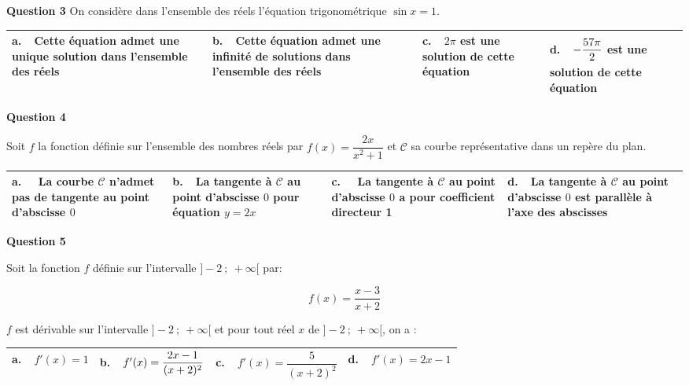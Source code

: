 \medskip

\textbf{Question 3} On considère dans l'ensemble des réels l'équation trigonométrique $\sin x = 1$.

\begin{center}
\begin{tabularx}{\linewidth}{|*{4}{X|}}\hline
\textbf{a.~~}Cette équation admet une unique solution dans l'ensemble des réels&\textbf{b.~~}Cette équation admet une infinité de solutions dans l'ensemble des réels&\textbf{c.~~}$2\pi$ est une solution de cette équation&\textbf{d.~~}$- \dfrac{57\pi\rule{0pt}{11pt}}{2\rule[-3pt]{0pt}{0pt}}$ est une solution de cette équation\\ \hline
\end{tabularx}
\end{center}

\medskip

\textbf{Question 4}

Soit $f$ la fonction définie sur l'ensemble des nombres réels par $f(x) = \dfrac{2x}{x^2 + 1}$
et $\mathcal{C}$ sa courbe représentative dans un repère du plan.

\begin{center}
\begin{tabularx}{\linewidth}{|*{4}{X|}}\hline
\textbf{a.~~} La courbe $\mathcal{C}$ n'admet pas de tangente au point d'abscisse $0$&\textbf{b.~~}La tangente à $\mathcal{C}$ au point d'abscisse $0$ pour équation $y = 2x$&\textbf{c.~~} La tangente à $\mathcal{C}$ au point d'abscisse $0$ a pour coefficient directeur 1&\textbf{d.~~}La tangente à $\mathcal{C}$ au point d'abscisse $0$ est parallèle à l'axe des abscisses\\ \hline
\end{tabularx}
\end{center}

\medskip

\textbf{Question 5}

Soit la fonction $f$ définie sur l'intervalle $]-2~;~ +\infty[$ par:

\[f(x) = \dfrac{x - 3}{x+2}\]

$f$ est dérivable sur l'intervalle $]-2~;~ +\infty[$ et pour tout réel $x$ de $]-2~;~ +\infty[$, on a :

\begin{center}
\begin{tabularx}{\linewidth}{|*{4}{X|}}\hline
\textbf{a.~~}$f'(x) = 1$&\textbf{b.~~}$f'(x) = \dfrac{2x - 1}{(x + 2)^2\rule[-5pt]{0pt}{0pt}}$&\textbf{c.~~}$f'(x) = \dfrac{5}{(x + 2)^2}$&\textbf{d.~~}$f'(x) = 2x - 1$\rule[-3mm]{0mm}{8mm}\\ \hline
\end{tabularx}
\end{center}

\bigskip
